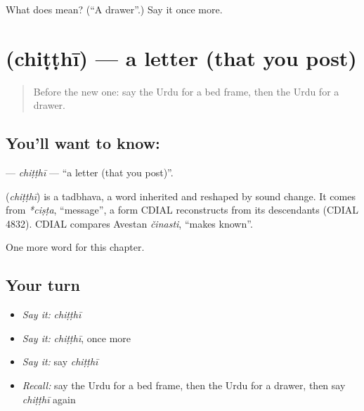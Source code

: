 \begin{tcolorbox}[breakable,colback=teal!4,colframe=teal!35!black,title={Before you move on}]
What does  mean? (\textquotedblleft{}A drawer\textquotedblright{}.) Say it once more.
\end{tcolorbox}
\section[\texorpdfstring{\ur{چٹھی} (chiṭṭhī)}{چٹھی (chiṭṭhī)}]{ (chiṭṭhī) — a letter (that you post)}

\label{lesson:UR-C113-chitthi}



\begin{quote}
Before the new one: say the Urdu for a bed frame, then the Urdu for a drawer.
\end{quote}

\subsection*{You'll want to know: }
\textbf{} — \emph{chiṭṭhī} — \textquotedblleft{}a letter (that you post)\textquotedblright{}.

\begin{cousinweb}
\textbf{} (\emph{chiṭṭhī}) is a tadbhava, a word inherited and reshaped by sound change. It comes from \emph{*ciṣṭa}, \textquotedblleft{}message\textquotedblright{}, a form CDIAL reconstructs from its descendants (CDIAL 4832). CDIAL compares Avestan \emph{činasti}, \textquotedblleft{}makes known\textquotedblright{}.
\end{cousinweb}

\begin{grammarlens}[title={What you've built}]
One more word for this chapter.
\end{grammarlens}

\subsection*{Your turn}
\begin{itemize}
\raggedright
  \item \emph{Say it:} \emph{chiṭṭhī}
  \item \emph{Say it:} \emph{chiṭṭhī}, once more
  \item \emph{Say it:} say \emph{chiṭṭhī}
  \item \emph{Recall:} say the Urdu for a bed frame, then the Urdu for a drawer, then say \emph{chiṭṭhī} again
\end{itemize}

